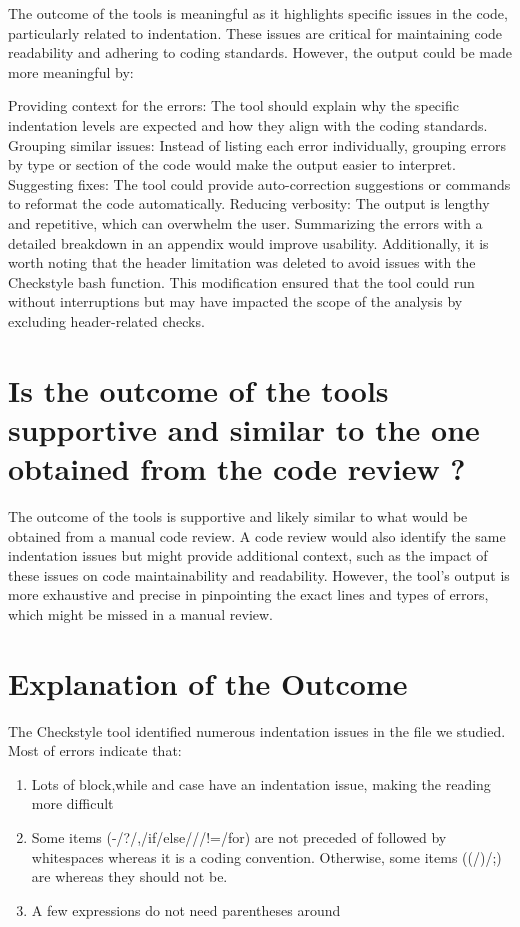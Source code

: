 \documentclass[twocolumn,10pt]{article}
\begin{document}
The outcome of the tools is meaningful as it highlights specific issues in the code, particularly related to indentation. These issues are critical for maintaining code readability and adhering to coding standards. However, the output could be made more meaningful by:

Providing context for the errors: The tool should explain why the specific indentation levels are expected and how they align with the coding standards.
Grouping similar issues: Instead of listing each error individually, grouping errors by type or section of the code would make the output easier to interpret.
Suggesting fixes: The tool could provide auto-correction suggestions or commands to reformat the code automatically.
Reducing verbosity: The output is lengthy and repetitive, which can overwhelm the user. Summarizing the errors with a detailed breakdown in an appendix would improve usability.
Additionally, it is worth noting that the header limitation was deleted to avoid issues with the Checkstyle bash function. This modification ensured that the tool could run without interruptions but may have impacted the scope of the analysis by excluding header-related checks.

\section{Is the outcome of the tools supportive and similar to the one obtained from the code review ?}
The outcome of the tools is supportive and likely similar to what would be obtained from a manual code review. A code review would also identify the same indentation issues but might provide additional context, such as the impact of these issues on code maintainability and readability. However, the tool's output is more exhaustive and precise in pinpointing the exact lines and types of errors, which might be missed in a manual review.

\section{Explanation of the Outcome}
The Checkstyle tool identified numerous indentation issues in the file we studied. Most of errors indicate that: 
\begin{enumerate}[itemsep=0pt, topsep=0pt]
    \item Lots of block,while and case have an indentation issue, making the reading more difficult
    \item Some items (-/?/,/if/else/{/}/!=/for) are not preceded of followed by whitespaces whereas it is a coding convention. Otherwise, some items ((/)/;) are whereas they should not be.
    \item A few expressions do not need parentheses around 
\end{enumerate}
\end{document}
